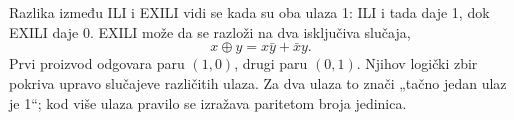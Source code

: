 
Razlika između ILI i EXILI vidi se kada su oba ulaza 1: ILI i tada daje 1, dok EXILI daje 0. EXILI može da se razloži na dva isključiva slučaja,
\[
x\oplus y=x\bar{y}+\bar{x}y.
\]
Prvi proizvod odgovara paru \((1,0)\), drugi paru \((0,1)\). Njihov logički zbir pokriva upravo slučajeve različitih ulaza. Za dva ulaza to znači „tačno jedan ulaz je 1“; kod više ulaza pravilo se izražava paritetom broja jedinica.
